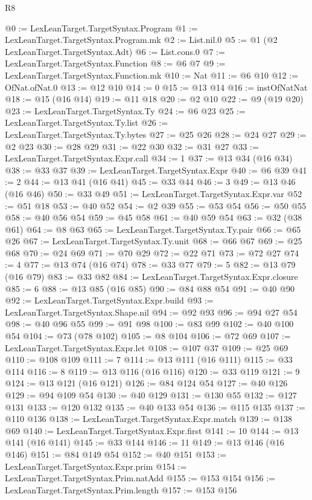 \begin{lexlean}{R8}
\begin{coremodule}
@0 := LexLeanTarget.TargetSyntax.Program
@1 := LexLeanTarget.TargetSyntax.Program.mk
@2 := List.nil.{0}
@5 := @1 (@2 LexLeanTarget.TargetSyntax.Adt)
@6 := List.cons.{0}
@7 := LexLeanTarget.TargetSyntax.Function
@8 := @6 @7
@9 := LexLeanTarget.TargetSyntax.Function.mk
@10 := Nat
@11 := @6 @10
@12 := OfNat.ofNat.{0}
@13 := @12 @10
@14 := 0
@15 := @13 @14
@16 := instOfNatNat
@18 := @15 (@16 @14)
@19 := @11 @18
@20 := @2 @10
@22 := @9 (@19 @20)
@23 := LexLeanTarget.TargetSyntax.Ty
@24 := @6 @23
@25 := LexLeanTarget.TargetSyntax.Ty.list
@26 := LexLeanTarget.TargetSyntax.Ty.bytes
@27 := @25 @26
@28 := @24 @27
@29 := @2 @23
@30 := @28 @29
@31 := @22 @30
@32 := @31 @27
@33 := LexLeanTarget.TargetSyntax.Expr.call
@34 := 1
@37 := @13 @34 (@16 @34)
@38 := @33 @37
@39 := LexLeanTarget.TargetSyntax.Expr
@40 := @6 @39
@41 := 2
@44 := @13 @41 (@16 @41)
@45 := @33 @44
@46 := 3
@49 := @13 @46 (@16 @46)
@50 := @33 @49
@51 := LexLeanTarget.TargetSyntax.Expr.var
@52 := @51 @18
@53 := @40 @52
@54 := @2 @39
@55 := @53 @54
@56 := @50 @55
@58 := @40 @56 @54
@59 := @45 @58
@61 := @40 @59 @54
@63 := @32 (@38 @61)
@64 := @8 @63
@65 := LexLeanTarget.TargetSyntax.Ty.pair
@66 := @65 @26
@67 := LexLeanTarget.TargetSyntax.Ty.unit
@68 := @66 @67
@69 := @25 @68
@70 := @24 @69
@71 := @70 @29
@72 := @22 @71
@73 := @72 @27
@74 := 4
@77 := @13 @74 (@16 @74)
@78 := @33 @77
@79 := 5
@82 := @13 @79 (@16 @79)
@83 := @33 @82
@84 := LexLeanTarget.TargetSyntax.Expr.closure
@85 := 6
@88 := @13 @85 (@16 @85)
@90 := @84 @88 @54
@91 := @40 @90
@92 := LexLeanTarget.TargetSyntax.Expr.build
@93 := LexLeanTarget.TargetSyntax.Shape.nil
@94 := @92 @93
@96 := @94 @27 @54
@98 := @40 @96 @55
@99 := @91 @98
@100 := @83 @99
@102 := @40 @100 @54
@104 := @73 (@78 @102)
@105 := @8 @104
@106 := @72 @69
@107 := LexLeanTarget.TargetSyntax.Expr.let
@108 := @107 @37
@109 := @25 @69
@110 := @108 @109
@111 := 7
@114 := @13 @111 (@16 @111)
@115 := @33 @114
@116 := 8
@119 := @13 @116 (@16 @116)
@120 := @33 @119
@121 := 9
@124 := @13 @121 (@16 @121)
@126 := @84 @124 @54
@127 := @40 @126
@129 := @94 @109 @54
@130 := @40 @129
@131 := @130 @55
@132 := @127 @131
@133 := @120 @132
@135 := @40 @133 @54
@136 := @115 @135
@137 := @110 @136
@138 := LexLeanTarget.TargetSyntax.Expr.match
@139 := @138 @69
@140 := LexLeanTarget.TargetSyntax.Expr.first
@141 := 10
@144 := @13 @141 (@16 @141)
@145 := @33 @144
@146 := 11
@149 := @13 @146 (@16 @146)
@151 := @84 @149 @54
@152 := @40 @151
@153 := LexLeanTarget.TargetSyntax.Expr.prim
@154 := LexLeanTarget.TargetSyntax.Prim.natAdd
@155 := @153 @154
@156 := LexLeanTarget.TargetSyntax.Prim.length
@157 := @153 @156

\end{coremodule}
\end{lexlean}
